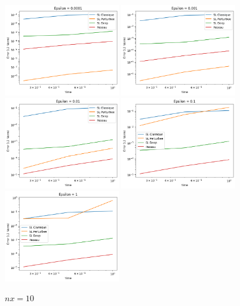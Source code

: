 \documentclass{article}
\begin{document}
\begin{figure}[!h]
    \centering
    \includegraphics[width=0.45\textwidth]{images/10ep11.png}
    \includegraphics[width=0.45\textwidth]{images/10ep12.png}
    \includegraphics[width=0.45\textwidth]{images/10ep13.png}
    \includegraphics[width=0.45\textwidth]{images/10ep14.png}
    \includegraphics[width=0.45\textwidth]{images/10ep15.png}
    \caption{$nx = 10$}
\end{figure}
\end{document}
